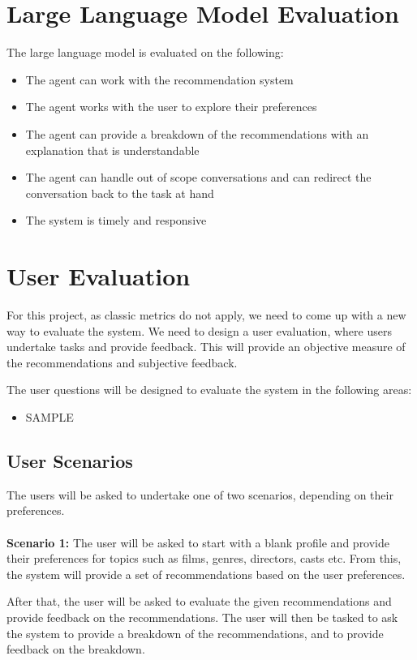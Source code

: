 \section{Large Language Model Evaluation}
\label{sec:large_language_model_evaluation}
The large language model is evaluated on the following:
\begin{itemize}
    \item The agent can work with the recommendation system
    \item The agent works with the user to explore their preferences
    \item The agent can provide a breakdown of the recommendations with an explanation that is understandable
    \item The agent can handle out of scope conversations and can redirect the conversation back to the task at hand
    \item The system is timely and responsive
\end{itemize}


\section{User Evaluation}
\label{sec:user_evaluation}
For this project, as classic metrics do not apply, we need to come up with a new way to evaluate the system. 
We need to design a user evaluation, where users undertake tasks and provide feedback. This will provide an objective measure of the recommendations and subjective feedback.


The user questions will be designed to evaluate the system in the following areas:
\begin{itemize}
    \item SAMPLE
\end{itemize}

\subsection{User Scenarios}
\label{sec:user_scenarios}
The users will be asked to undertake one of two scenarios, depending on their preferences.
\\\\
\textbf{Scenario 1:} The user will be asked to start with a blank profile and provide their preferences for topics such as films, genres, directors, casts etc.
From this, the system will provide a set of recommendations based on the user preferences.

After that, the user will be asked to evaluate the given recommendations and provide feedback on the recommendations.
The user will then be tasked to ask the system to provide a breakdown of the recommendations, and to provide feedback on the breakdown.

